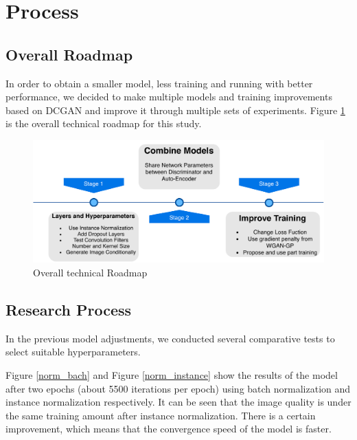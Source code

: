 \section{Process}
\subsection{Overall Roadmap}

In order to obtain a smaller model, less training and running with better performance, we decided to make multiple models and training improvements based on DCGAN and improve it through multiple sets of experiments.
Figure \ref{roadmap} is the overall technical roadmap for this study.

\begin{figure}
    \begin{center}
    \includegraphics[width=\textwidth]{figures/roadmap.pdf}
    \caption{Overall technical Roadmap}
    \label{roadmap}
    \end{center}
\end{figure}


\subsection{Research Process}

In the previous model adjustments, we conducted several comparative tests to select suitable
hyperparameters.

Figure \ref{norm_bach} and Figure \ref{norm_instance} show the results of the model after two epochs (about 5500 iterations per epoch) using batch normalization and instance normalization respectively.
It can be seen that the image quality is under the same training amount after instance normalization.
There is a certain improvement, which means that the convergence speed of the model is faster.

